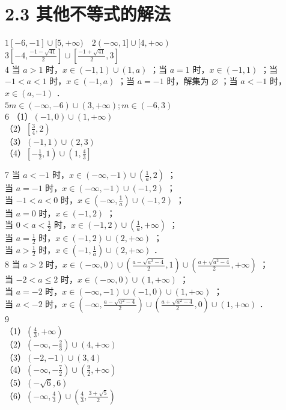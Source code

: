 \documentclass[10pt]{article}
\begin{document}
\section*{2.3 其他不等式的解法}
\(1[-6,-1] \cup[5,+\infty) \quad 2(-\infty, 1] \cup[4,+\infty)\)\\
\(3\left[-4, \frac{-1-\sqrt{41}}{2}\right] \cup\left[\frac{-1+\sqrt{41}}{2}, 3\right]\)\\
4 当 \(a>1\) 时，\(x \in(-1,1) \cup(1, a)\) ；当 \(a=1\) 时，\(x \in(-1,1)\) ；当 \(-1<a<1\) 时，\(x \in(-1, a)\) ；当 \(a=-1\) 时，解集为 \(\varnothing\) ；当 \(a<-1\) 时，\(x \in(a,-1)\) ．\\
\(5 m \in(-\infty,-6) \cup(3,+\infty) ; m \in(-6,3)\)\\
6 （1）\((-1,0) \cup(1,+\infty)\)\\
（2）\(\left[\frac{3}{4}, 2\right)\)\\
（3）\((-1,1) \cup(2,3)\)\\
（4）\(\left[-\frac{1}{2}, 1\right) \cup\left(1, \frac{4}{3}\right]\)

7 当 \(a<-1\) 时，\(x \in(-\infty,-1) \cup\left(\frac{1}{a}, 2\right)\) ；\\
当 \(a=-1\) 时，\(x \in(-\infty,-1) \cup(-1,2)\) ；\\
当 \(-1<a<0\) 时，\(x \in\left(-\infty, \frac{1}{a}\right) \cup(-1,2)\) ；\\
当 \(a=0\) 时，\(x \in(-1,2)\) ；\\
当 \(0<a<\frac{1}{2}\) 时，\(x \in(-1,2) \cup\left(\frac{1}{a},+\infty\right)\) ；\\
当 \(a=\frac{1}{2}\) 时，\(x \in(-1,2) \cup(2,+\infty)\) ；\\
当 \(a>\frac{1}{2}\) 时，\(x \in\left(-1, \frac{1}{a}\right) \cup(2,+\infty)\) ．\\
8 当 \(a>2\) 时，\(x \in(-\infty, 0) \cup\left(\frac{a-\sqrt{a^{2}-4}}{2}, 1\right) \cup\left(\frac{a+\sqrt{a^{2}-4}}{2},+\infty\right)\) ；\\
当 \(-2<a \leqslant 2\) 时，\(x \in(-\infty, 0) \cup(1,+\infty)\) ；\\
当 \(a=-2\) 时，\(x \in(-\infty,-1) \cup(-1,0) \cup(1,+\infty)\) ；\\
当 \(a<-2\) 时，\(x \in\left(-\infty, \frac{a-\sqrt{a^{2}-4}}{2}\right) \cup\left(\frac{a+\sqrt{a^{2}-4}}{2}, 0\right) \cup(1,+\infty)\) ．\\
9\\
（1）\(\left(\frac{4}{3},+\infty\right)\)\\
（2）\(\left(-\infty,-\frac{2}{3}\right) \cup(4,+\infty)\)\\
（3）\((-2,-1) \cup(3,4)\)\\
（4）\(\left(-\infty,-\frac{7}{2}\right) \cup\left(\frac{9}{2},+\infty\right)\)\\
（5）\((-\sqrt{6}, 6)\)\\
（6）\(\left(-\infty, \frac{4}{3}\right) \cup\left(\frac{4}{3}, \frac{3+\sqrt{5}}{2}\right)\)
\end{document}
